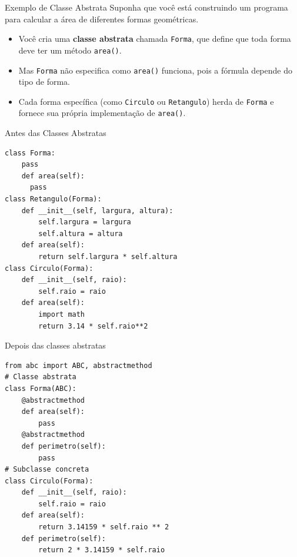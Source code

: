 \begin{frame}{Exemplo de Classe Abstrata}
    Suponha que você está construindo um programa para calcular a área de diferentes formas geométricas.

    \begin{itemize}
        \item Você cria uma \textbf{classe abstrata} chamada \texttt{Forma}, que define que toda forma deve ter um método \texttt{area()}.
        \item Mas \texttt{Forma} não especifica como \texttt{area()} funciona, pois a fórmula depende do tipo de forma.
        \item Cada forma específica (como \texttt{Circulo} ou \texttt{Retangulo}) herda de \texttt{Forma} e fornece sua própria implementação de \texttt{area()}.
    \end{itemize}
\end{frame}

\begin{frame}[fragile]{Antes das Classes Abstratas}

\small
\begin{verbatim}
class Forma:
    pass
    def area(self):
      pass
class Retangulo(Forma):
    def __init__(self, largura, altura):
        self.largura = largura
        self.altura = altura
    def area(self):
        return self.largura * self.altura
class Circulo(Forma):
    def __init__(self, raio):
        self.raio = raio
    def area(self):
        import math
        return 3.14 * self.raio**2
\end{verbatim}

\end{frame}

\begin{frame}[fragile]{Depois das classes abstratas}

\small
\begin{verbatim}
from abc import ABC, abstractmethod
# Classe abstrata
class Forma(ABC):
    @abstractmethod
    def area(self):
        pass
    @abstractmethod
    def perimetro(self):
        pass
# Subclasse concreta
class Circulo(Forma):
    def __init__(self, raio):
        self.raio = raio
    def area(self):
        return 3.14159 * self.raio ** 2
    def perimetro(self):
        return 2 * 3.14159 * self.raio
\end{verbatim}

\end{frame}

